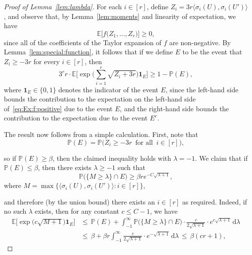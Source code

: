 \documentclass[12pt,reqno]{amsart}
\theoremstyle{definition}
\theoremstyle{remark}
\def\Pr{\mathbb{P}}
\newcommand\Ex{\mathbb{E}}
\renewcommand{\le}{\leqslant}
\renewcommand{\ge}{\geqslant}
\begin{document}
%
\begin{proof}[Proof of Lemma~\ref{lem:lambda}]
	For each \(i \in [r]\), define \(Z_i = 3r\big\langle \sigma_i(U),\sigma_i(U') \big\rangle\), and observe that, by Lemma~\ref{lem:moments} and linearity of expectation, we have
	\begin{equation}
		\label{eq:Ex:f:positive}
		\Ex\big[ f\big( Z_1,\ldots,Z_r \big) \big] \ge 0,
	\end{equation}
	since all of the coefficients of the Taylor expansion of \(f\) are non-negative. By Lemma~\ref{lem:special:function}, it follows that if we define \(E\) to be the event that \(Z_i \ge -3r\)
	for every \(i \in [r]\), then
	\begin{equation}
		\label{eq:eventE:inequality}
		3^r r \cdot \Ex\bigg[ \exp\bigg( \sum_{i = 1}^r \sqrt{ Z_i + 3r } \bigg) \mathbf{1}_E \bigg] \ge 1 - \Pr(E),
	\end{equation}
	where \(\mathbf{1}_E \in \{0,1\}\) denotes the indicator of the event \(E\), since the left-hand side bounds the
	contribution to the expectation on the left-hand side of~\eqref{eq:Ex:f:positive} due to the event \(E\), and the right-hand side bounds the
	contribution to the expectation due to the event \(E^c\).

	The result now follows from a simple calculation. First, note that
	\begin{equation*}
		\Pr(E) = \Pr\Big( Z_i \ge - 3r \, \text{ for all } \, i \in [r] \Big),
	\end{equation*}

	so if \(\Pr(E) \ge \beta\), then the claimed inequality holds with \(\lambda = -1\). We claim that if \(\Pr(E) \le \beta\), then there exists \(\lambda \ge -1\) such that
	\begin{equation}
		\label{eq:max:big:and:E}
		\Pr\Big( \big\{ M \ge \lambda \big\} \cap E \Big) \ge \beta r e^{-C\sqrt{\lambda + 1}},
	\end{equation}
	where \(M = \max \big\{ \big\langle \sigma_i(U),\sigma_i(U') \big\rangle : i \in [r] \big\}\),

	and therefore (by the union bound) there exists an \(i \in [r]\) as required. Indeed, if no such \(\lambda\) exists, then for any constant \(c \le C - 1\), we have
	\begin{align*}
		\Ex\Big[ \exp\big( c \sqrt{M + 1} \big) \mathbf{1}_E \Big]
		& \le \, \Pr(E) + \int_{-1}^\infty \Pr\Big( \big\{ M \ge \lambda \big\} \cap E \Big) \cdot \frac{c}{2\sqrt{\lambda + 1}} \cdot e^{c \sqrt{\lambda + 1}} \,\mathrm{d}\lambda \\
		& \le \, \beta + \beta r \int_{-1}^\infty \frac{c}{2\sqrt{\lambda + 1}} \cdot e^{- \sqrt{\lambda + 1}} \,\mathrm{d}\lambda \, \le \, \beta (cr + 1),


\end{align*}
\end{proof}
\end{document}
